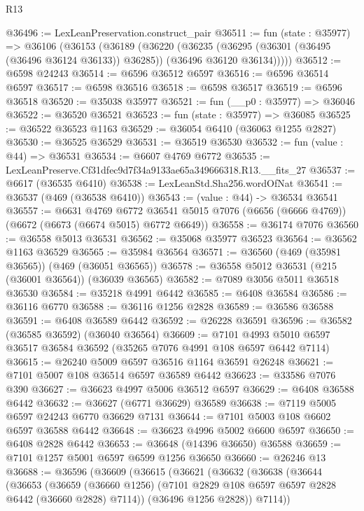 \begin{lexlean}{R13}
\begin{coremodule}
@36496 := LexLeanPreservation.construct_pair
@36511 := fun (state : @35977) =>
  @36106
    (@36153
      (@36189
        (@36220
          (@36235
            (@36295 (@36301 (@36495 (@36496 @36124 @36133)) @36285))
            (@36496 @36120 @36134)))))
@36512 := @6598 @24243
@36514 := @6596 @36512 @6597
@36516 := @6596 @36514 @6597
@36517 := @6598 @36516
@36518 := @6598 @36517
@36519 := @6596 @36518
@36520 := @35038 @35977
@36521 := fun (__p0 : @35977) => @36046
@36522 := @36520 @36521
@36523 := fun (state : @35977) => @36085
@36525 := @36522 @36523 @1163
@36529 := @36054 @6410 (@36063 @1255 @2827)
@36530 := @36525 @36529
@36531 := @36519 @36530
@36532 := fun (value : @44) => @36531
@36534 := @6607 @4769 @6772
@36535 := LexLeanPreserve.Cf31dfec9d7f34a9133ae65a349666318.R13.__fits_27
@36537 := @6617 (@36535 @6410)
@36538 := LexLeanStd.Sha256.wordOfNat
@36541 := @36537 (@469 (@36538 @6410))
@36543 := (value : @44) -> @36534 @36541
@36557 := @6631
    @4769
    @6772
    @36541
    @5015
    @7076
    (@6656 (@6666 @4769))
    (@6672 (@6673 (@6674 @5015) @6772 @6649))
@36558 := @36174 @7076
@36560 := @36558 @5013 @36531
@36562 := @35068 @35977 @36523
@36564 := @36562 @1163 @36529
@36565 := @35984 @36564
@36571 := @36560 (@469 (@35981 @36565)) (@469 (@36051 @36565))
@36578 := @36558 @5012 @36531 (@215 (@36001 @36564)) (@36039 @36565)
@36582 := @7089 @3056 @5011 @36518 @36530
@36584 := @35218 @4991 @6442
@36585 := @6408 @36584
@36586 := @36116 @6770
@36588 := @36116 @1256 @2828
@36589 := @36586 @36588
@36591 := @6408 @36589 @6442
@36592 := @26228 @36591
@36596 := @36582 (@36585 @36592) (@36040 @36564)
@36609 := @7101 @4993 @5010 @6597 @36517 @36584 @36592 (@35265 @7076 @4991 @108 @6597 @6442 @7114)
@36615 := @26240 @5009 @6597 @36516 @1164 @36591 @26248
@36621 := @7101 @5007 @108 @36514 @6597 @36589 @6442
@36623 := @33586 @7076 @390
@36627 := @36623 @4997 @5006 @36512 @6597
@36629 := @6408 @36588 @6442
@36632 := @36627 (@6771 @36629) @36589
@36638 := @7119 @5005 @6597 @24243 @6770 @36629 @7131
@36644 := @7101 @5003 @108 @6602 @6597 @36588 @6442
@36648 := @36623 @4996 @5002 @6600 @6597
@36650 := @6408 @2828 @6442
@36653 := @36648 (@14396 @36650) @36588
@36659 := @7101 @1257 @5001 @6597 @6599 @1256 @36650
@36660 := @26246 @13
@36688 := @36596
    (@36609
      (@36615
        (@36621
          (@36632
            (@36638
              (@36644
                (@36653
                  (@36659
                    (@36660 @1256)
                    (@7101 @2829 @108 @6597 @6597 @2828 @6442 (@36660 @2828) @7114))
                  (@36496 @1256 @2828))
                @7114))

\end{coremodule}
\end{lexlean}

